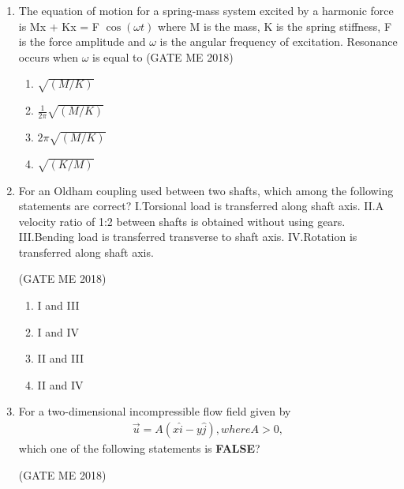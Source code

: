 \documentclass[journal]{IEEEtran}
\numberwithin{equation}{enumi}
\numberwithin{figure}{enumi}
\begin{document}
\begin{enumerate}
\begin{multicols}{4}
    \begin{enumerate}
        \item $(\sigma_1+\sigma_3)/2$
        \item $(\sigma_1-\sigma_3)/2$
        \item $\sqrt{(\sigma_1+\sigma_3)/2}$
                \item $\sqrt{(\sigma_1-\sigma_3)/2}$
    \end{enumerate}
\end{multicols}
    \item The equation of motion for a spring-mass system excited by a harmonic force is
 Mx + Kx = F $\cos(\omega t)$
where M is the mass, K is the spring stiffness, F is the force amplitude and $\omega$ is the angular frequency of excitation. Resonance occurs when $\omega$ is equal to
  \hfill{(GATE ME 2018)}
\begin{enumerate}
    
\item $\sqrt{(M/K)}$ 
\item $\frac{1}{2\pi}\sqrt{(M/K)} $
\item $2\pi \sqrt{(M/K)}$
\item  $\sqrt{(K/M)}$ 
\end{enumerate}
\item For an Oldham coupling used between two shafts, which among the following statements
are correct?
I.Torsional load is transferred along shaft axis.
II.A velocity ratio of 1:2 between shafts is obtained without using gears.
III.Bending load is transferred transverse to shaft axis.
IV.Rotation is transferred along shaft axis.

  \hfill{(GATE ME 2018)}
  
\begin{enumerate}
\item  I and III
\item  I and IV
\item  II and III
\item  II and IV
\end{enumerate}

 \item For a two-dimensional incompressible flow field given by
\begin{align*}
\vec{u} = A(x\hat{i} - y\hat{j}), {where } A > 0,
\end{align*}
which one of the following statements is \textbf{FALSE}?

  \hfill{(GATE ME 2018)}
  

\end{enumerate}
\end{document}
